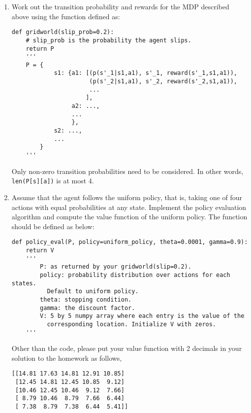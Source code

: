 \begin{enumerate}
    \item Work out the transition probability and rewards for the MDP described
    above using the function defined as:
    \begin{verbatim}
def gridworld(slip_prob=0.2):
    # slip_prob is the probability the agent slips.
    return P
    '''
    P = {
            s1: {a1: [(p(s'_1|s1,a1), s'_1, reward(s'_1,s1,a1)),
                      (p(s'_2|s1,a1), s'_2, reward(s'_2,s1,a1)),
                      ...
                     ],
                 a2: ...,
                 ...
                 },
            s2: ...,
            ...
        }
    '''
    \end{verbatim}
    Only non-zero transition probabilities need to be considered. In other
    words, \texttt{len(P[s][a])} is at most 4.

    \item [7 pts] Assume that the agent follows the uniform policy, that is,
    taking one of four actions with equal probabilities at any state.
    Implement the policy evaluation algorithm and compute the value
    function of the uniform policy.
    The function should be defined as below:
    \begin{verbatim}
def policy_eval(P, policy=uniform_policy, theta=0.0001, gamma=0.9):
    return V
    '''
        P: as returned by your gridworld(slip=0.2).
        policy: probability distribution over actions for each states.
          Default to uniform policy.
        theta: stopping condition.
        gamma: the discount factor.
        V: 5 by 5 numpy array where each entry is the value of the
          corresponding location. Initialize V with zeros.
    '''
    \end{verbatim}
    Other than the code, please put your value function with 2 decimals
    in your solution to the homework as follows,
    \begin{verbatim}
[[14.81 17.63 14.81 12.91 10.85]
 [12.45 14.81 12.45 10.85  9.12]
 [10.46 12.45 10.46  9.12  7.66]
 [ 8.79 10.46  8.79  7.66  6.44]
 [ 7.38  8.79  7.38  6.44  5.41]]
    \end{verbatim}


\end{enumerate}

